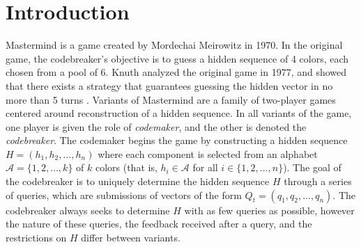 \documentclass[12pt, a4paper]{article}
\author{\theauthor}
\title{\thetitle}
\date{\duedate}
\begin{document}
\maketitle
\begin{abstract}
	We study variants of Mastermind, a popular board game in which the objective is sequence reconstruction. In this two-player game, the so-called \textit{codemaker} constructs a hidden sequence $H = (h_1, h_2, \ldots, h_n)$ of colors selected from an alphabet $\mathcal{A} = \{1,2,\ldots, k\}$ (\textit{i.e.,} $h_i\in\mathcal{A}$ for all $i\in\{1,2,\ldots, n\}$). The game then proceeds in turns, each of which consists of two parts: in turn $t$, the second player (the \textit{codebreaker}) first submits a query sequence $Q_t = (q_1, q_2, \ldots, q_n)$ with $q_i\in \mathcal{A}$ for all $i$, and second receives feedback $\Delta(Q_t, H)$, where $\Delta$ is some agreed-upon function of distance between two sequences with $n$ components. The game terminates when $Q_t = H$, and the codebreaker seeks to end the game in as few turns as possible. Throughout we let $f(n,k)$ denote the smallest integer such that the codebreaker can determine any $H$ in $f(n,k)$ turns. We prove three main results: First, when $H$ is known to be a permutation of $\{1,2,\ldots, n\}$, we prove that $f(n, n)\ge n - \log\log(n)$ for all sufficiently large $n$. Second, we show that Knuth's Minimax algorithm identifies any $H$ in at most $nk$ queries. Third, when feedback is not received until all queries have been submitted, we show that $f(n,k)=\Omega(n\log k)$.
\end{abstract}

\section{Introduction}
Mastermind is a game created by Mordechai Meirowitz in 1970. In the original game, the codebreaker's objective is to guess a hidden sequence of 4 colors, each chosen from a pool of 6. Knuth analyzed the original game in 1977, and showed that there exists a strategy that guarantees guessing the hidden vector in no more than 5 turns \cite{DK76}. Variants of Mastermind are a family of two-player games centered around reconstruction of a hidden sequence. In all variants of the game, one player is given the role of \textit{codemaker}, and the other is denoted the \textit{codebreaker}. The codemaker begins the game by constructing a hidden sequence $H = (h_1, h_2, \ldots, h_n)$ where each component is selected from an alphabet $\mathcal{A} = \{1,2,\ldots,k\}$ of $k$ colors (that is, $h_i\in\mathcal{A}$ for all $i\in\{1,2,\ldots,n\}$). The goal of the codebreaker is to uniquely determine the hidden sequence $H$ through a series of queries, which are submissions of vectors of the form $Q_t = (q_1, q_2, \ldots, q_n)$. The codebreaker always seeks to determine $H$ with as few queries as possible, however the nature of these queries, the feedback received after a query, and the restrictions on $H$ differ between variants.
\end{document}
